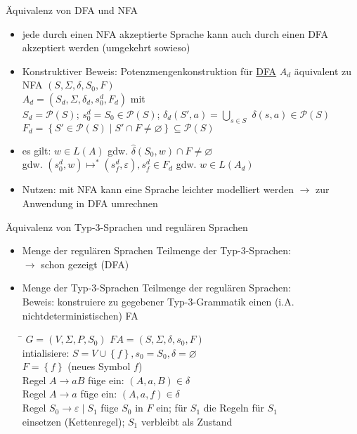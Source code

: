 \begin{frame}{Äquivalenz von DFA und NFA}
	\begin{itemize}
		\item jede durch einen NFA akzeptierte Sprache kann auch durch einen DFA akzeptiert werden (umgekehrt sowieso)
		\item Konstruktiver Beweis: Potenzmengenkonstruktion für \underline{DFA} $A_d$ äquivalent zu NFA $(S, \Sigma, \delta, S_0, F)$\\
		$A_d=\left(S_d, \Sigma, \delta_d, s_0^d, F_d\right)$ mit\\
		\quad $S_d=\mathcal{P}(S)$; 
		\quad $s_0^d=S_0 \in \mathcal{P}(S)$;
		\quad $\delta_d(S', a)=\bigcup_{s \in S}$
		\quad $\delta(s, a) \in \mathcal{P}(S)$\\
		\quad $F_d = \left\{S' \in \mathcal{P}(S) \mid S' \cap F \neq \varnothing\right\} \subseteq \mathcal{P}(S)$
		\item es gilt: $w \in L(A)$ gdw. $\hat{\delta}(S_0, w) \cap F \neq \varnothing$\\
		\quad gdw. $(s_0^d, w) \mapsto^* (s_f^d, \varepsilon), s_f^d \in F_d$ gdw. $w \in L(A_d)$
		\item Nutzen: mit NFA kann eine Sprache leichter modelliert werden $\rightarrow$ zur Anwendung in DFA umrechnen
	\end{itemize}
\end{frame}

\begin{frame}{Äquivalenz von Typ-3-Sprachen und regulären Sprachen}
	\begin{itemize}
		\item Menge der regulären Sprachen Teilmenge der Typ-3-Sprachen:\\
		\quad $\rightarrow$ schon gezeigt (DFA)
		\item Menge der Typ-3-Sprachen Teilmenge der regulären Sprachen:\\
		Beweis: konstruiere zu gegebener Typ-3-Grammatik einen (i.A. nichtdeterministischen) FA\\
		\begin{tabbing}
			\hspace{5cm}\=\kill
		$G=(V,\Sigma, P, S_0)$	\> $FA=(S, \Sigma, \delta, s_0, F)$\\ 
			\> intialisiere: $S=V \cup \left\{f\right\}, s_0=S_0, \delta=\varnothing$\\ 
			\> $F=\left\{f\right\}$ (neues Symbol $f$)\\ 
		Regel $A \rightarrow aB$	\> füge ein: $(A, a, B) \in \delta$\\ 
		Regel $A \rightarrow a$	\> füge ein: $(A, a, f) \in \delta$\\ 
		Regel $S_0 \rightarrow \varepsilon \mid S_1$	\> füge $S_0$ in $F$ ein; für $S_1$ die Regeln für $S_1$\\ 
			\> einsetzen (Kettenregel); $S_1$ verbleibt als Zustand
		\end{tabbing} 
	\end{itemize}
\end{frame}